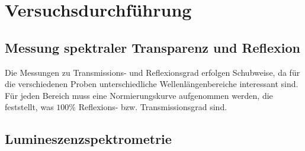 \section{Versuchsdurchführung}
	\subsection{Messung spektraler Transparenz und Reflexion} \label{sec:shimadzu}
    	Die Messungen zu Transmissions- und Reflexionsgrad erfolgen Schubweise, da für die verschiedenen Proben unterschiedliche Wellenlängenbereiche interessant sind. Für jeden Bereich muss eine Normierungskurve aufgenommen werden, die feststellt, was $ 100\unit{\%} $ Reflexions- bzw. Transmissionsgrad sind.
        
	
	\subsection{Lumineszenzspektrometrie}
